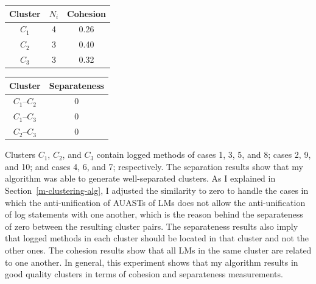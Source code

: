 
\begin{minipage}[b]{.40\textwidth}
   \centering
   \begin{tabular}{ ccc}\toprule
     {Cluster}&{$N_i$}&{Cohesion}\\
    \toprule
    $C_1$&4& 0.26 \\
    \midrule
    $C_2$&3& 0.40\\
    \midrule
    $C_3$&3& 0.32\\
 	\bottomrule
   \end{tabular}
   \label{tab:cohesion}
\end{minipage}\qquad
\begin{minipage}[b]{.40\textwidth}
   \centering
   \begin{tabular}{ cc}\toprule
     {Cluster}&{Separateness}\\
    \toprule
    $C_1$--$C_2$& 0\\
    \midrule
    $C_1$--$C_3$& 0\\
    \midrule
    $C_2$--$C_3$& 0\\
 	\bottomrule
   \end{tabular}
   \label{tab:separateness}

\end{minipage}


Clusters $C_1$, $C_2$, and $C_3$ contain logged methods of cases 1, 3, 5, and 8; cases 2, 9, and 10; and cases 4, 6, and 7; respectively.
The separation results show that my algorithm was able to generate well-separated clusters.
As I explained in Section~\ref{m-clustering-alg}, I adjusted the similarity to zero to handle the cases in which the anti-unification of AUASTs of LMs does not allow the anti-unification of log statements with one another, which is the reason behind the separateness of zero between the resulting cluster pairs. The separateness results also imply that logged methods in each cluster should be located in that cluster and not the other ones. The cohesion results show that all LMs in the same cluster are related to one another. In general, this experiment shows that my algorithm results in good quality clusters in terms of cohesion and separateness measurements.


